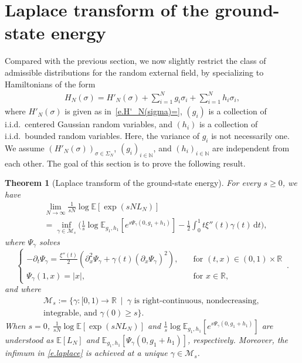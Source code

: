 \documentclass[11pt]{amsart}
\newtheorem{theorem}[proposition]{Theorem}
\theoremstyle{remark}
\theoremstyle{definition}
\numberwithin{equation}{section}
\numberwithin{proposition}{section}
\numberwithin{figure}{section}
\numberwithin{table}{section}
\newcommand{\N}{\mathbb{N}}
\newcommand{\R}{\mathbb{R}}
\newcommand{\E}{\mathbb{E}}
\renewcommand{\ge}{\geqslant}
\newcommand{\Ll}{\left}
\newcommand{\Rr}{\right}
\renewcommand{\d}{\mathrm{d}}
\newcommand{\1}{\mathbf{1}}
\newcommand{\mcl}{\mathcal}
\newcommand{\ga}{\gamma}
\newcommand{\cM}{\mathcal{M}}
\begin{document}
%
%
%
%
%
%
\section{Laplace transform of the ground-state energy}
\label{s.laplace}


Compared with the previous section, we now slightly restrict the class of admissible distributions for the random external field, by specializing to Hamiltonians of the form
\begin{align}\label{e.H_N=H'_N+g+h}
    H_N(\sigma) = H'_N(\sigma) + \sum_{i=1}^N g_i \sigma_i + \sum_{i=1}^N h_i \sigma_i,
\end{align}
where $H'_N(\sigma)$ is given as in~\eqref{e.H'_N(sigma)=}, $(g_i)$ is a collection of i.i.d.\ centered Gaussian random variables, and $(h_i)$ is a collection of i.i.d.\ bounded random variables. Here, the variance of $g_i$ is not necessarily one. We assume $(H'_N(\sigma))_{\sigma\in\Sigma_N}$, $(g_i)_{i\in\N}$, and $(h_i)_{i\in\N}$ are independent from each other. The goal of this section is to prove the following result. 

\begin{theorem}[Laplace transform of the ground-state energy]
\label{t.laplace}
For every $s \ge 0$, we have
\begin{equation}
\label{e.laplace}
\begin{split}
    &\lim_{N\to \infty} \frac{1}{sN} \log \E \Ll[ \exp(sN L_N) \Rr]  \\
&=  \inf_{\gamma \in \cM_{s }}\bigg( \frac 1 s \log \E_{g_1,h_1}\Ll[e^{s\Psi_{\gamma}(0,g_1+h_1)}\Rr] - \frac{1}{2} \int_0^1 t \xi''(t) \gamma(t) \, \d t \bigg),
\end{split}
\end{equation}
where $\Psi_\ga$ solves
\begin{equation}\label{eq:parisipsi}
	\begin{cases}
		-\partial_t \Psi_{\ga} =  \frac{\xi''(t)}{2} ( \partial_{x}^2 \Psi_\ga + \ga(t) ( \partial_x \Psi_\ga )^2), & \quad \text{for } (t,x) \in (0,1) \times \R \\
		\Psi_{\ga}(1,x) = |x| , & \quad \text{for } x \in \R,
	\end{cases}
	\, .
\end{equation}
and where 
\begin{multline}  \label{e.M_s=}
\mcl M_s := \big\{ \gamma : [0,1) \to \R \ \mid \ \gamma \text{ is right-continuous, nondecreasing, }
\\ \text{integrable, and } \gamma(0) \ge s \big\} .
\end{multline}
When $s=0$, $\frac{1}{sN}\log\E\Ll[\exp(sNL_N)\Rr]$ and $\frac 1 s \log \E_{g_1,h_1}\Ll[e^{s\Psi_{\gamma}(0,g_1+h_1)}\Rr]$ are understood as $\E\Ll[L_N\Rr]$ and $\E_{g_1,h_1}\Ll[\Psi_{\gamma}(0,g_1+h_1)\Rr]$, respectively.
Moreover, the infimum in \eqref{e.laplace} is achieved at a unique $\ga \in \mcl M_s$. 
\end{theorem}
\end{document}
